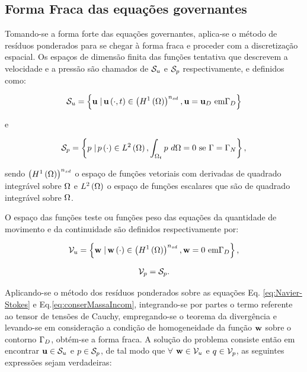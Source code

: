 \documentclass[tese_patricia]{subfiles}%
\begin{document}
\subsection{Forma Fraca das equações governantes} \label{capitulo:Cap2:FormaFraca}

Tomando-se a forma forte das equações governantes, aplica-se o método de resíduos ponderados para se chegar à forma fraca e proceder com a discretização espacial. Os espaços de dimensão finita das funções tentativa que descrevem a velocidade e a pressão são chamados de $\mathcal{S}_u$ e $\mathcal{S}_p$ respectivamente, e definidos como:

\begin{align}
\mathcal{S}_u = \left\{\mathbf{u} \left . \right| \mathbf{u} \left(\cdot,t\right) \in \left(H^{1}\left(\Omega\right)\right)^{n_{sd}}, \mathbf{u} = \mathbf{u}_D \textrm { em} \Gamma_D \right\}
\end{align}

\noindent e

\begin{align}
\mathcal{S}_p = \left\{p \left . \right| p \left(\cdot\right) \in L^{2}\left(\Omega\right), \int_{\Omega_t}p \textrm { } d\Omega = 0 \textrm { se } \Gamma = \Gamma_N \right\},
\end{align}

\noindent sendo $\left(H^{1}\left(\Omega\right)\right)^{n_{sd}}$ o espaço de funções vetoriais com derivadas de quadrado integrável sobre $\Omega$ e $L^{2}\left(\Omega\right)$ o espaço de funções escalares que são de quadrado integrável sobre $\Omega$.

O espaço das funções teste ou funções peso das equações da quantidade de movimento e da continuidade são definidos respectivamente por:

\begin{align}
\mathcal{V}_u = \left\{\mathbf{w} \left . \right| \mathbf{w} \left(\cdot\right) \in \left(H^{1}\left(\Omega\right)\right)^{n_{sd}}, \mathbf{w} = 0 \textrm { em} \Gamma_D \right\},
\end{align}


\begin{align}
\mathcal{V}_p = \mathcal{S}_p.
\end{align}

Aplicando-se o método dos resíduos ponderados sobre as equações Eq. \eqref{eq:Navier-Stokes} e Eq.\eqref{eq:conserMassaIncom}, integrando-se por partes o termo referente ao tensor de tensões de Cauchy, empregando-se o teorema da divergência e levando-se em consideração a condição de homogeneidade da função $\mathbf{w}$ sobre o contorno $\Gamma_D$, obtém-se a forma fraca. A solução do problema consiste então em encontrar $\mathbf{u} \in \mathcal{S}_u$ e $p \in \mathcal{S}_p$, de tal modo que $\forall$ $\mathbf{w} \in \mathcal{V}_u$ e $q \in \mathcal{V}_p$, as seguintes expressões sejam verdadeiras:
\end{document}
